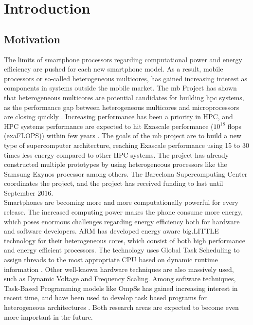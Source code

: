 \chapter{Introduction}

\section{Motivation}
\label{sec:mot}
The limits of smartphone processors regarding computational power and energy efficiency are pushed for each new smartphone model. As a result, mobile processors or so-called heterogeneous multicores, has gained increasing interest as components in systems outside the mobile market. The \gls{mb} Project \cite{MB} has shown that heterogeneous multicores are potential candidates for building \gls{hpc} systems, as the performance gap between heterogeneous multicores and microprocessors are closing quickly \cite{a:MB:Raj13}. Increasing performance has been a priority in HPC, and HPC systems performance are expected to hit Exascale performance ($10^{18}$ \gls{flops} (exaFLOPS)) within few years \cite{TOP500}. The goals of the \gls{mb} project are to build a new type of supercomputer architecture, reaching Exascale performance using 15 to 30 times less energy compared to other HPC systems. The project has already constructed multiple prototypes by using heterogeneous processors like the Samsung Exynos \cite{EXY} processor among others. The Barcelona Supercomputing Center coordinates the project, and the project has received funding to last until September 2016. \\

Smartphones are becoming more and more computationally powerful for every release. The increased computing power makes the phone consume more energy, which poses enormous challenges regarding energy efficiency both for hardware and software developers. ARM has developed energy aware big.LITTLE technology for their heterogeneous cores, which consist of both high performance and energy efficient processors. The technology uses Global Task Scheduling to assign threads to the most appropriate CPU based on dynamic runtime information \cite{a:ARM:bL}. Other well-known hardware techniques are also massively used, such as Dynamic Voltage and Frequency Scaling. Among software techniques, Task-Based Programming models like OmpSs \cite{a:ompss2013} has gained increasing interest in recent time, and have been used to develop task based programs for heterogeneous architectures \cite{a:Lien2012}. Both research areas are expected to become even more important in the future. \\

